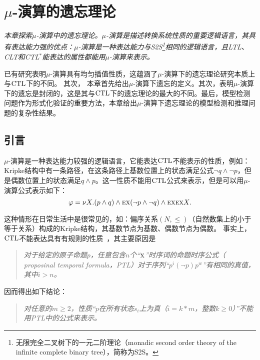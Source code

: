 \chapter{$\mu$-演算的遗忘理论}
\label{chapter06}

{\em 本章探索$\mu$-演算中的遗忘理论。$\mu$-演算是描述转换系统性质的重要逻辑语言，其具有表达能力强的优点：$\mu$-演算是一种表达能力与S2S\footnote{无限完全二叉树下的一元二阶理论（monadic second order theory of the infinite complete binary tree），简称为S2S。}相同的逻辑语言，且LTL、CLT和CTL$^*$能表达的属性都能用$\mu$-演算来表示。
	
	已有研究表明$\mu$-演算具有均匀插值性质，这蕴涵了$\mu$-演算下的遗忘理论研究本质上与$\textrm{CTL}$下的不同。
	其次，
	本章首先给出$\mu$-演算下遗忘的定义。其次，表明$\mu$-演算下的遗忘是封闭的，这是其与$\textrm{CTL}$下的遗忘理论的最大的不同。最后，模型检测问题作为形式化验证的重要方法，本章给出$\mu$-演算下遗忘理论的模型检测和推理问题的复杂性结果。
	}

\section{引言}
$\mu$-演算是一种表达能力较强的逻辑语言，它能表达$\textrm{CTL}$不能表示的性质，例如：Kripke结构中有一条路径，在这条路径上基数位置上的状态满足公式$\neg q \wedge \neg p$，但是偶数位置上的状态满足$q \wedge p$。这一性质不能用$\textrm{CTL}$公式来表示，但是可以用$\mu$-演算公式表示如下：
$$\varphi = \nu X.(p \wedge q) \wedge \textsc{e} \textsc{x}(\neg p \wedge \neg q) \wedge \textsc{e} \textsc{x} \textsc{e} \textsc{x} X.$$

这种情形在日常生活中是很常见的，如：偏序关系$(N, \leq)$（自然数集上的小于等于关系）构成的Kripke结构，其基数节点为基数、偶数节点为偶数。
事实上，$\textrm{CTL}$不能表达具有有规则的性质~\cite{DBLP:journals/iandc/Wolper83}，其主要原因是
\begin{quote}
	\emph{对于给定的原子命题$p$，任意包含$n$个“$\textsc{x}$”时序词的命题时序公式（ proposinal temporal formula，PTL）对于序列“$p^i(\neg p) p^w$”有相同的真值，其中$i > n$。%
}
\end{quote}

因而得出如下结论：
\begin{quote}
	\emph{对任意的$m\geq 2$，性质“$p$在所有状态$s_i$上为真（$i = k*m$，整数$k\geq 0$）”不能用PTL中的公式来表示。
}
\end{quote}




